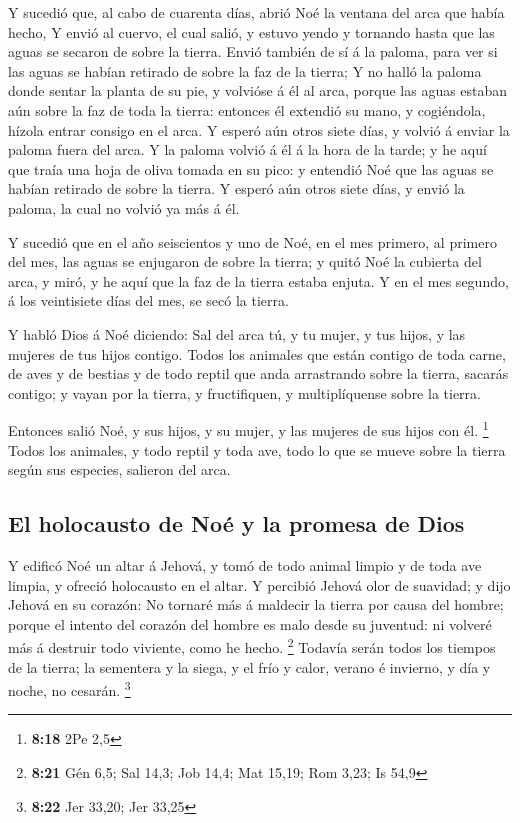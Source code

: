  Y sucedió que, al cabo de cuarenta días, abrió Noé la
ventana del arca que había hecho,  Y envió al cuervo, el
cual salió, y estuvo yendo y tornando hasta que las aguas se secaron de
sobre la tierra.  Envió también de sí á la paloma, para ver
si las aguas se habían retirado de sobre la faz de la tierra;
 Y no halló la paloma donde sentar la planta de su pie, y
volvióse á él al arca, porque las aguas estaban aún sobre la faz de toda
la tierra: entonces él extendió su mano, y cogiéndola, hízola entrar
consigo en el arca.  Y esperó aún otros siete días, y
volvió á enviar la paloma fuera del arca.  Y la paloma
volvió á él á la hora de la tarde; y he aquí que traía una hoja de oliva
tomada en su pico: y entendió Noé que las aguas se habían retirado de
sobre la tierra.  Y esperó aún otros siete días, y envió la
paloma, la cual no volvió ya más á él.

 Y sucedió que en el año seiscientos y uno de Noé, en el
mes primero, al primero del mes, las aguas se enjugaron de sobre la
tierra; y quitó Noé la cubierta del arca, y miró, y he aquí que la faz
de la tierra estaba enjuta.  Y en el mes segundo, á los
veintisiete días del mes, se secó la tierra.

 Y habló Dios á Noé diciendo:  Sal del arca
tú, y tu mujer, y tus hijos, y las mujeres de tus hijos contigo.
 Todos los animales que están contigo de toda carne, de
aves y de bestias y de todo reptil que anda arrastrando sobre la tierra,
sacarás contigo; y vayan por la tierra, y fructifiquen, y multiplíquense
sobre la tierra.

 Entonces salió Noé, y sus hijos, y su mujer, y las mujeres
de sus hijos con él. \footnote{\textbf{8:18} 2Pe 2,5} 
Todos los animales, y todo reptil y toda ave, todo lo que se mueve sobre
la tierra según sus especies, salieron del arca.

\hypertarget{el-holocausto-de-nouxe9-y-la-promesa-de-dios}{%
\subsection{El holocausto de Noé y la promesa de
Dios}\label{el-holocausto-de-nouxe9-y-la-promesa-de-dios}}

 Y edificó Noé un altar á Jehová, y tomó de todo animal
limpio y de toda ave limpia, y ofreció holocausto en el altar.
 Y percibió Jehová olor de suavidad; y dijo Jehová en su
corazón: No tornaré más á maldecir la tierra por causa del hombre;
porque el intento del corazón del hombre es malo desde su juventud: ni
volveré más á destruir todo viviente, como he hecho. \footnote{\textbf{8:21}
  Gén 6,5; Sal 14,3; Job 14,4; Mat 15,19; Rom 3,23; Is 54,9}
 Todavía serán todos los tiempos de la tierra; la sementera
y la siega, y el frío y calor, verano é invierno, y día y noche, no
cesarán. \footnote{\textbf{8:22} Jer 33,20; Jer 33,25}

